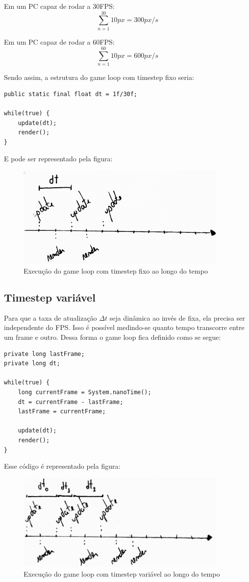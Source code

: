 \documentclass[12pt, 
openright, 
oneside, 
a4paper,    
brazil]{facom-ufu-abntex2}
\begin{document}
\noindent
Em um PC capaz de rodar a 30FPS: $$\sum_{n=1}^{30} 10px = 300 px/s$$

\noindent
Em um PC capaz de rodar a 60FPS: $$\sum_{n=1}^{60} 10px = 600 px/s$$

\noindent
Sendo assim, a estrutura do game loop com timestep fixo seria:
\begin{lstlisting}[caption=Game Loop com timestep fixo]
public static final float dt = 1f/30f;

while(true) {
	update(dt);
	render();
}
\end{lstlisting}
E pode ser representado pela figura:
\begin{figure}[H]
	\centering
	\includegraphics[width=28em]{imagens/ilu2_small.png}
	\caption{Execução do game loop com timestep fixo ao longo do tempo}
\end{figure}

\subsection{Timestep variável}
Para que a taxa de atualização $\Delta t$ seja dinâmica ao invés de fixa, ela precisa ser independente do FPS. Isso é possível medindo-se quanto tempo transcorre entre um frame e outro. Dessa forma o game loop fica definido como se segue:

\begin{lstlisting}[caption=Game loop com timestep variável]
private long lastFrame;
private long dt;
		
while(true) {
	long currentFrame = System.nanoTime(); 
	dt = currentFrame - lastFrame;
	lastFrame = currentFrame;
	
	update(dt);
	render();
}
\end{lstlisting}
Esse código é representado pela figura:
\begin{figure}[H]
	\centering
	\includegraphics[width=28em]{imagens/ilu3_small.png}
	\caption{Execução do game loop com timestep variável ao longo do tempo}
\end{figure}
\end{document}
